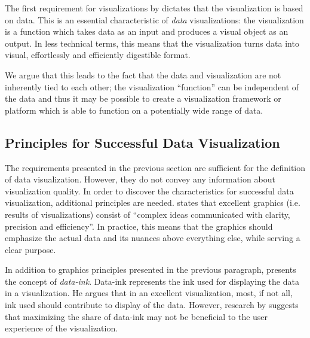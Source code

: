 The first requirement for visualizations by \citet{kosara_visualization_2007} dictates that the visualization is based on data. This is an essential characteristic of \emph{data} visualizations: the visualization is a function which takes data as an input and produces a visual object as an output. In less technical terms, this means that the visualization turns data into visual, effortlessly and efficiently digestible format.

We argue that this leads to the fact that the data and visualization are not inherently tied to each other; the visualization ``function'' can be independent of the data and thus it may be possible to create a visualization framework or platform which is able to function on a potentially wide range of data.



\subsection{Principles for Successful Data Visualization}

The requirements presented in the previous section are sufficient for the definition of data visualization. However, they do not convey any information about visualization quality. In order to discover the characteristics for successful data visualization, additional principles are needed. \citet[p.~13]{tufte_visual_1986} states that excellent graphics (i.e. results of visualizations) consist of ``complex ideas communicated with clarity, precision and efficiency''. In practice, this means that the graphics should emphasize the actual data and its nuances above everything else, while serving a clear purpose.

In addition to graphics principles presented in the previous paragraph, \citet[p.~93]{tufte_visual_1986} presents the concept of \emph{data-ink}. Data-ink represents the ink used for displaying the data in a visualization. He argues that in an excellent visualization, most, if not all, ink used should contribute to display of the data. However, research by \citet{inbar_minimalism_2007} suggests that maximizing the share of data-ink may not be beneficial to the user experience of the visualization. 

